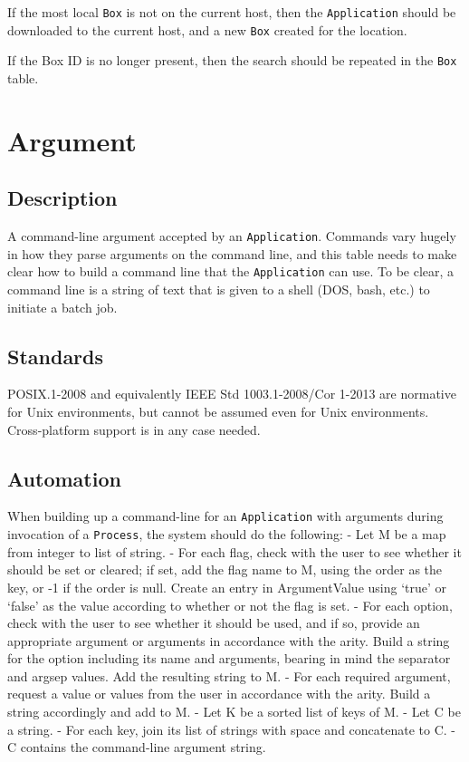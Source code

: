 \documentclass[
]{article}
\begin{document}
If the most local \texttt{Box} is not on the current host, then the
\texttt{Application} should be downloaded to the current host, and a new
\texttt{Box} created for the location.

If the Box ID is no longer present, then the search should be repeated
in the \texttt{Box} table. \textbar{}

\section{Argument}\label{argument}

\subsection{Description}\label{description-1}

A command-line argument accepted by an \texttt{Application}. Commands
vary hugely in how they parse arguments on the command line, and this
table needs to make clear how to build a command line that the
\texttt{Application} can use. To be clear, a command line is a string of
text that is given to a shell (DOS, bash, etc.) to initiate a batch job.

\subsection{Standards}\label{standards-2}

POSIX.1-2008 and equivalently IEEE Std 1003.1-2008/Cor 1-2013 are
normative for Unix environments, but cannot be assumed even for Unix
environments. Cross-platform support is in any case needed.

\subsection{Automation}\label{automation-2}

When building up a command-line for an \texttt{Application} with
arguments during invocation of a \texttt{Process}, the system should do
the following: - Let M be a map from integer to list of string. - For
each flag, check with the user to see whether it should be set or
cleared; if set, add the flag name to M, using the order as the key, or
-1 if the order is null. Create an entry in ArgumentValue using `true'
or `false' as the value according to whether or not the flag is set. -
For each option, check with the user to see whether it should be used,
and if so, provide an appropriate argument or arguments in accordance
with the arity. Build a string for the option including its name and
arguments, bearing in mind the separator and argsep values. Add the
resulting string to M. - For each required argument, request a value or
values from the user in accordance with the arity. Build a string
accordingly and add to M. - Let K be a sorted list of keys of M. - Let C
be a string. - For each key, join its list of strings with space and
concatenate to C. - C contains the command-line argument string.
\end{document}
